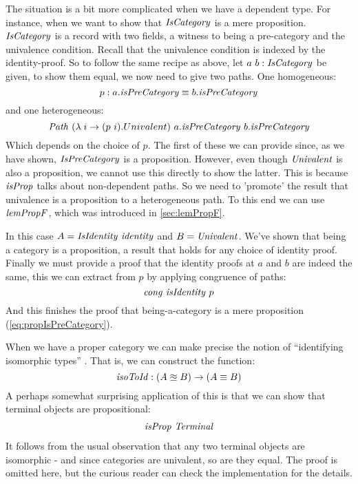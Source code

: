 The situation is a bit more complicated when we have a dependent type. For
instance, when we want to show that $\mathit{IsCategory}$ is a mere proposition.
$\mathit{IsCategory}$ is a record with two fields, a witness to being a pre-category and
the univalence condition. Recall that the univalence condition is indexed by the
identity-proof. So to follow the same recipe as above, let $a\ b \mathrel{:}
\mathit{IsCategory}$ be given, to show them equal, we now need to give two paths. One homogeneous:
%
$$
p \mathrel{:} a.\mathit{isPreCategory} \equiv b.\mathit{isPreCategory}
$$
%
and one heterogeneous:
%
$$
\Path\ (\lambda\; i \to (p\ i).Univalent)\ a.\isPreCategory\ b.\isPreCategory
$$
%
Which depends on the choice of $p$. The first of these we can provide since, as
we have shown, $\mathit{IsPreCategory}$ is a proposition. However, even though
$\mathit{Univalent}$ is also a proposition, we cannot use this directly to show the
latter. This is because $\mathit{isProp}$ talks about non-dependent paths. So we need to
'promote' the result that univalence is a proposition to a heterogeneous path.
To this end we can use $\mathit{lemPropF}$, which was introduced in \ref{sec:lemPropF}.

In this case $A = \var{IsIdentity}\ \identity$ and $B = \mathit{Univalent}$. We've
shown that being a category is a proposition, a result that holds for any choice
of identity proof. Finally we must provide a proof that the identity proofs at
$a$ and $b$ are indeed the same, this we can extract from $p$ by applying
congruence of paths:
%
$$
\mathit{cong}\ \mathit{isIdentity}\ p
$$
%
And this finishes the proof that being-a-category is a mere proposition
(\ref{eq:propIsPreCategory}).

When we have a proper category we can make precise the notion of ``identifying
isomorphic types'' . That is, we can construct the
function:
%
$$
\mathit{isoToId} \mathrel{:} (A \approxeq B) \to (A \equiv B)
$$
%
A perhaps somewhat surprising application of this is that we can show that
terminal objects are propositional:
%
\begin{align}
\label{eq:termProp}
\mathit{isProp}\ \mathit{Terminal}
\end{align}
%
It follows from the usual observation that any two terminal objects are
isomorphic - and since categories are univalent, so are they equal. The proof is
omitted here, but the curious reader can check the implementation for the
details. 

